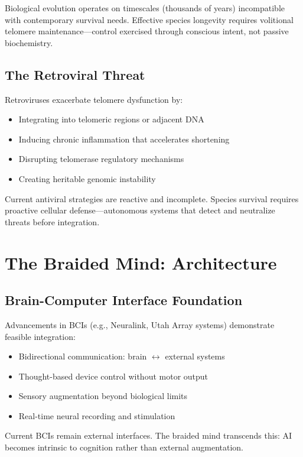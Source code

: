 \documentclass[reprint, amsmath, amssymb, aps, prd]{revtex4-2}
\begin{document}
Biological evolution operates on timescales (thousands of years) incompatible with contemporary survival needs. Effective species longevity requires volitional telomere maintenance---control exercised through conscious intent, not passive biochemistry.

\subsection{The Retroviral Threat}

Retroviruses exacerbate telomere dysfunction by:
\begin{itemize}
    \item Integrating into telomeric regions or adjacent DNA
    \item Inducing chronic inflammation that accelerates shortening
    \item Disrupting telomerase regulatory mechanisms
    \item Creating heritable genomic instability
\end{itemize}

Current antiviral strategies are reactive and incomplete. Species survival requires proactive cellular defense---autonomous systems that detect and neutralize threats before integration.

\section{The Braided Mind: Architecture}

\subsection{Brain-Computer Interface Foundation}

Advancements in BCIs (e.g., Neuralink, Utah Array systems) demonstrate feasible integration:
\begin{itemize}
    \item Bidirectional communication: brain $\leftrightarrow$ external systems
    \item Thought-based device control without motor output
    \item Sensory augmentation beyond biological limits
    \item Real-time neural recording and stimulation
\end{itemize}

Current BCIs remain external interfaces. The braided mind transcends this: AI becomes intrinsic to cognition rather than external augmentation.
\end{document}
